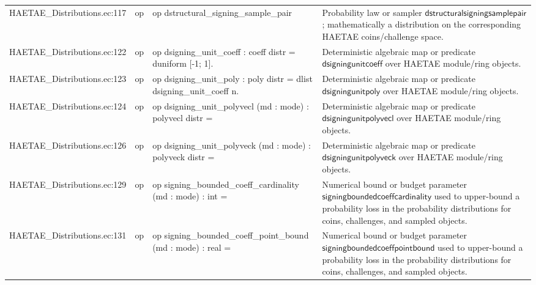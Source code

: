 \documentclass[10pt]{article}
\begin{document}
\begin{longtable}{L{0.11\textwidth}L{0.055\textwidth}L{0.385\textwidth}L{0.41\textwidth}}
HAETAE\_\allowbreak{}Distributions.\allowbreak{}ec:\allowbreak{}117 & op & {\ttfamily\scriptsize op dstructural\_\allowbreak{}signing\_\allowbreak{}sample\_\allowbreak{}pair} & Probability law or sampler $\mathsf{dstructuralsigningsamplepair}$; mathematically a distribution on the corresponding HAETAE coins/challenge space. \\
HAETAE\_\allowbreak{}Distributions.\allowbreak{}ec:\allowbreak{}122 & op & {\ttfamily\scriptsize op dsigning\_\allowbreak{}unit\_\allowbreak{}coeff : coeff distr = duniform [-1; 1].} & Deterministic algebraic map or predicate $\mathsf{dsigningunitcoeff}$ over HAETAE module/ring objects. \\
HAETAE\_\allowbreak{}Distributions.\allowbreak{}ec:\allowbreak{}123 & op & {\ttfamily\scriptsize op dsigning\_\allowbreak{}unit\_\allowbreak{}poly : poly distr = dlist dsigning\_\allowbreak{}unit\_\allowbreak{}coeff n.} & Deterministic algebraic map or predicate $\mathsf{dsigningunitpoly}$ over HAETAE module/ring objects. \\
HAETAE\_\allowbreak{}Distributions.\allowbreak{}ec:\allowbreak{}124 & op & {\ttfamily\scriptsize op dsigning\_\allowbreak{}unit\_\allowbreak{}polyvecl (md : mode) : polyvecl distr =} & Deterministic algebraic map or predicate $\mathsf{dsigningunitpolyvecl}$ over HAETAE module/ring objects. \\
HAETAE\_\allowbreak{}Distributions.\allowbreak{}ec:\allowbreak{}126 & op & {\ttfamily\scriptsize op dsigning\_\allowbreak{}unit\_\allowbreak{}polyveck (md : mode) : polyveck distr =} & Deterministic algebraic map or predicate $\mathsf{dsigningunitpolyveck}$ over HAETAE module/ring objects. \\
HAETAE\_\allowbreak{}Distributions.\allowbreak{}ec:\allowbreak{}129 & op & {\ttfamily\scriptsize op signing\_\allowbreak{}bounded\_\allowbreak{}coeff\_\allowbreak{}cardinality (md : mode) : int =} & Numerical bound or budget parameter $\mathsf{signingboundedcoeffcardinality}$ used to upper-bound a probability loss in the probability distributions for coins, challenges, and sampled objects. \\
HAETAE\_\allowbreak{}Distributions.\allowbreak{}ec:\allowbreak{}131 & op & {\ttfamily\scriptsize op signing\_\allowbreak{}bounded\_\allowbreak{}coeff\_\allowbreak{}point\_\allowbreak{}bound (md : mode) : real =} & Numerical bound or budget parameter $\mathsf{signingboundedcoeffpointbound}$ used to upper-bound a probability loss in the probability distributions for coins, challenges, and sampled objects. \\

\end{longtable}
\end{document}
